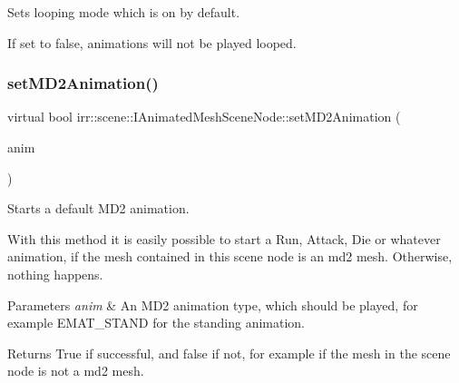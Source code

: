 Sets looping mode which is on by default. 

If set to false, animations will not be played looped. \mbox{\label{classirr_1_1scene_1_1IAnimatedMeshSceneNode_aca2ca2593857c60aac61c0fd78365d2d}} 
\subsubsection{\texorpdfstring{set\+M\+D2\+Animation()}{setMD2Animation()}\hspace{0.1cm}{\footnotesize\ttfamily [1/4]}}
{\footnotesize\ttfamily virtual bool irr\+::scene\+::\+I\+Animated\+Mesh\+Scene\+Node\+::set\+M\+D2\+Animation (\begin{DoxyParamCaption}\item[{\hyperlink{namespaceirr_1_1scene_a08d4a84966e1d2886d0d57e4acbb4f19}{E\+M\+D2\+\_\+\+A\+N\+I\+M\+A\+T\+I\+O\+N\+\_\+\+T\+Y\+PE}}]{anim }\end{DoxyParamCaption})\hspace{0.3cm}{\ttfamily [pure virtual]}}



Starts a default M\+D2 animation. 

With this method it is easily possible to start a Run, Attack, Die or whatever animation, if the mesh contained in this scene node is an md2 mesh. Otherwise, nothing happens. 
\begin{DoxyParams}{Parameters}
{\em anim} & An M\+D2 animation type, which should be played, for example E\+M\+A\+T\+\_\+\+S\+T\+A\+ND for the standing animation. \\
\hline
\end{DoxyParams}
\begin{DoxyReturn}{Returns}
True if successful, and false if not, for example if the mesh in the scene node is not a md2 mesh. 
\end{DoxyReturn}
\mbox{\label{classirr_1_1scene_1_1IAnimatedMeshSceneNode_aca2ca2593857c60aac61c0fd78365d2d}} 
